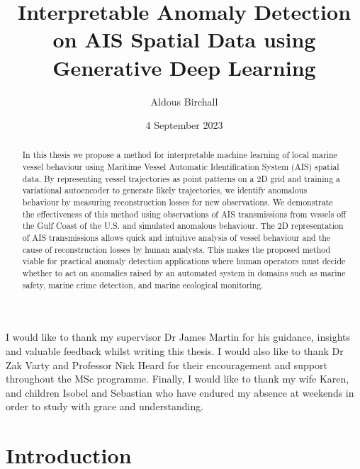 \documentclass{mldsmsc}
\title{Interpretable Anomaly Detection on AIS Spatial Data using Generative Deep Learning}
\author{Aldous Birchall}
\date{4 September 2023}
\begin{document}
\maketitle


\declaration 


\begin{abstract}
	In this thesis we propose a method for interpretable machine learning of local marine vessel behaviour using Maritime Vessel Automatic Identification System (AIS) spatial data. By representing vessel trajectories as point patterns on a 2D grid and training a variational autoencoder to generate likely trajectories, we identify anomalous behaviour by measuring reconstruction losses for new observations. We demonstrate the effectiveness of this method using observations of AIS transmissions from vessels off the Gulf Coast of the U.S. and simulated anomalous behaviour. The 2D representation of AIS transmissions allows quick and intuitive analysis of vessel behaviour and the cause of reconstruction losses by human analysts. This makes the proposed method viable for practical anomaly detection applications where human operators must decide whether to act on anomalies raised by an automated system in domains such as marine safety, marine crime detection, and marine ecological monitoring.
\end{abstract}

\begin{acknowledgements}
	I would like to thank my supervisor Dr James Martin for his guidance, insights and valuable feedback whilst writing this thesis. I would also like to thank Dr Zak Varty and Professor Nick Heard for their encouragement and support throughout the MSc programme. Finally, I would like to thank my wife Karen, and children Isobel and Sebastian who have endured my absence at weekends in order to study with grace and understanding.  
\end{acknowledgements}


\tableofcontents

\mainmatter


\chapter{Introduction}
\end{document}
